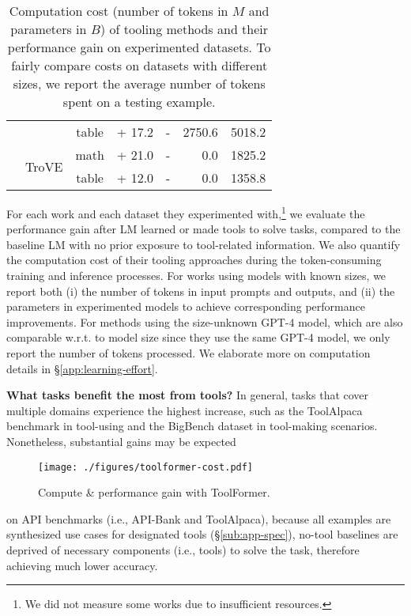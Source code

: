 \begin{table}[ht]
\begin{center}
{\begin{tabular}{llcrcrr}
    {} & {} & \color{darklavender} {table} & {+ 17.2} & {-} & {2750.6} & {5018.2} \\
    \cmidrule{2-7}
    {} & \multirow{2}{*}{TroVE} & \color{ao} {math} & {+ 21.0} & {-} & {0.0} & {1825.2} \\
    {} & {} & \color{darklavender} {table} & {+ 12.0} & {-} & {0.0} & {1358.8} \\
    \bottomrule
    \end{tabular}
    }
\end{center}
\vspace{-2mm}
\caption{Computation cost (number of tokens in $M$ and parameters in $B$) of tooling methods and their performance gain on experimented datasets. To fairly compare costs on datasets with different sizes, we report the average number of tokens spent on a testing example.}
\vspace{-3mm}
\label{tab:compute-cost}
\end{table}



For each work and each dataset they experimented with,\footnote{ We did not measure some works due to insufficient resources.} we evaluate the performance gain after LM learned or made tools to solve tasks, compared to the baseline LM with no prior exposure to tool-related information.
We also quantify the computation cost of their tooling approaches during the token-consuming training and inference processes. For works using models with known sizes, we report both (i) the number of tokens in input prompts and outputs, and (ii) the parameters in experimented models to achieve corresponding performance improvements. For methods using the size-unknown GPT-4 model, which are also comparable w.r.t. to model size since they use the same GPT-4 model, we only report the number of tokens processed.
We elaborate more on computation details in \S\ref{app:learning-effort}.





\noindent \textbf{What tasks benefit the most from tools?} \quad
In general, tasks that cover multiple domains experience the highest increase, such as the ToolAlpaca benchmark in tool-using and the BigBench dataset in tool-making scenarios. Nonetheless, substantial gains may be expected
\begin{wrapfigure}[12]{r}{0.33\textwidth}
\vspace{-3mm}
\texttt{[image: ./figures/toolformer-cost.pdf]}
\vspace{-3mm}
\caption{Compute \& performance gain with ToolFormer.}
\vspace{-2mm}
\label{fig:toolformer-cost}
\end{wrapfigure}
on API benchmarks (i.e., API-Bank and ToolAlpaca), because all examples are synthesized use cases for designated tools (\S\ref{sub:app-spec}), no-tool baselines are deprived of necessary components (i.e., tools) to solve the task, therefore achieving much lower accuracy.


